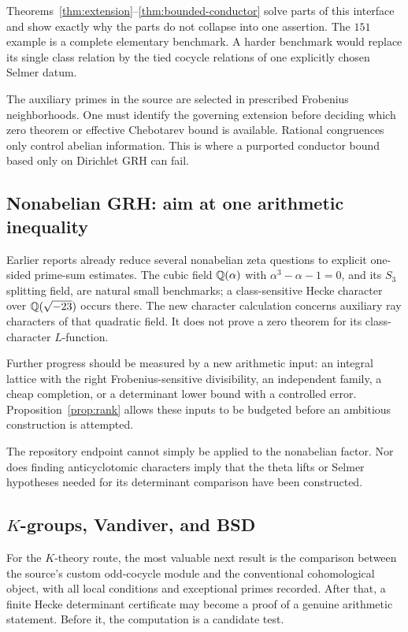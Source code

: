 Theorems~\ref{thm:extension}--\ref{thm:bounded-conductor} solve parts of this interface and show exactly why the parts do not collapse into one assertion. The $151$ example is a complete elementary benchmark. A harder benchmark would replace its single class relation by the tied cocycle relations of one explicitly chosen Selmer datum.

The auxiliary primes in the source are selected in prescribed Frobenius neighborhoods. One must identify the governing extension before deciding which zero theorem or effective Chebotarev bound is available. Rational congruences only control abelian information. This is where a purported conductor bound based only on Dirichlet GRH can fail.

\subsection{Nonabelian GRH: aim at one arithmetic inequality}

Earlier reports already reduce several nonabelian zeta questions to explicit one-sided prime-sum estimates. The cubic field $\mathbb Q(\alpha)$ with $\alpha^3-\alpha-1=0$, and its $S_3$ splitting field, are natural small benchmarks; a class-sensitive Hecke character over $\mathbb Q(\sqrt{-23})$ occurs there. The new character calculation concerns auxiliary ray characters of that quadratic field. It does not prove a zero theorem for its class-character $L$-function.

Further progress should be measured by a new arithmetic input: an integral lattice with the right Frobenius-sensitive divisibility, an independent family, a cheap completion, or a determinant lower bound with a controlled error. Proposition~\ref{prop:rank} allows these inputs to be budgeted before an ambitious construction is attempted.

The repository endpoint cannot simply be applied to the nonabelian factor. Nor does finding anticyclotomic characters imply that the theta lifts or Selmer hypotheses needed for its determinant comparison have been constructed.

\subsection{\texorpdfstring{$K$}{K}-groups, Vandiver, and BSD}

For the $K$-theory route, the most valuable next result is the comparison between the source's custom odd-cocycle module and the conventional cohomological object, with all local conditions and exceptional primes recorded. After that, a finite Hecke determinant certificate may become a proof of a genuine arithmetic statement. Before it, the computation is a candidate test.

